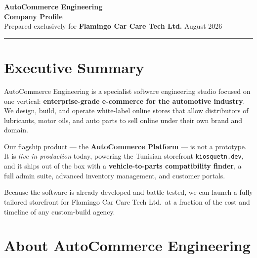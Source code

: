 \documentclass[11pt,a4paper]{article}
\begin{document}
\begin{center}
  {\Huge\bfseries\color{accent}AutoCommerce Engineering}\\[0.4em]
  {\large\bfseries Company Profile}\\[0.2em]
  {\normalsize\color{gray}
    Prepared exclusively for \textbf{Flamingo Car Care Tech Ltd.}
    \quad\textbar{} August 2026}\\[1.2em]
  \rule{\textwidth}{1.2pt}
\end{center}

\section{Executive Summary}

AutoCommerce Engineering is a specialist software engineering studio
focused on one vertical: \textbf{enterprise-grade e-commerce for the
automotive industry}. We design, build, and operate white-label online
stores that allow distributors of lubricants, motor oils, and auto
parts to sell online under their own brand and domain.

Our flagship product --- the \textbf{AutoCommerce Platform} --- is not
a prototype. It is \emph{live in production} today, powering the
Tunisian storefront \texttt{kiosquetn.dev}, and it ships out of the box
with a \textbf{vehicle-to-parts compatibility finder}, a full admin
suite, advanced inventory management, and customer portals.

Because the software is already developed and battle-tested, we can
launch a fully tailored storefront for Flamingo Car Care Tech Ltd.\ at
a fraction of the cost and timeline of any custom-build agency.

\section{About AutoCommerce Engineering}
\end{document}
